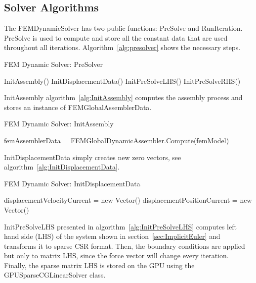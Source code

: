 \documentclass[en]{minipw} %
\begin{document}
\subsection{Solver Algorithms}
The FEMDynamicSolver has two public functions: PreSolve and RunIteration. PreSolve is used to compute and store all the constant data that are used throughout all iterations. Algorithm~\ref{alg:presolver} shows the necessary steps.

\begin{algorithm}
\caption{FEM Dynamic Solver: PreSolver}
\label{alg:presolver}
\begin{algorithmic}[1]
\State InitAssembly()
\State InitDisplacementData()
\State InitPreSolveLHS()
\State InitPreSolveRHS()
\EndProcedure
\end{algorithmic}
\end{algorithm}

InitAssembly algorithm~\ref{alg:InitAssembly} computes the assembly process and stores an instance of FEMGlobalAssemblerData.

\begin{algorithm}
\caption{FEM Dynamic Solver: InitAssembly}
\label{alg:InitAssembly}
\begin{algorithmic}[1]
\State femAssemblerData = FEMGlobalDynamicAssembler.Compute(femModel)
\EndProcedure
\end{algorithmic}
\end{algorithm}

InitDisplacementData simply creates new zero vectors, see algorithm~\ref{alg:InitDisplacementData}.
 
\begin{algorithm}
\caption{FEM Dynamic Solver: InitDisplacementData}
\label{alg:InitDisplacementData}
\begin{algorithmic}[1]
\State displacementVelocityCurrent = new Vector()
\State displacementPositionCurrent = new Vector()
\EndProcedure
\end{algorithmic}
\end{algorithm}

InitPreSolveLHS presented in algorithm~\ref{alg:InitPreSolveLHS} computes left hand side (LHS) of the system shown in section~\ref{sec:ImplicitEuler} and transforms it to sparse CSR format. Then, the boundary conditions are applied but only to matrix LHS, since the force vector will change every iteration. Finally, the sparse matrix LHS is stored on the GPU using the GPUSparseCGLinearSolver class. 
\end{document}
